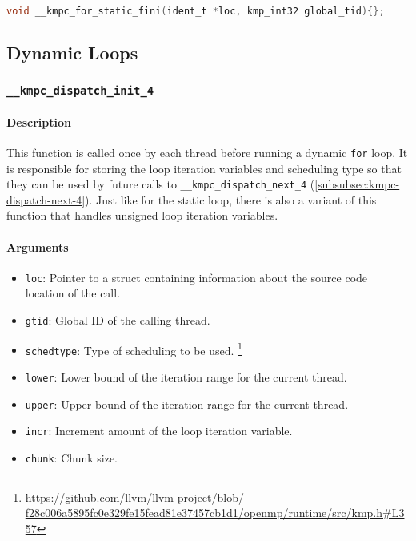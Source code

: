 \begin{lstlisting}[language=C, caption={\_\_kmpc\_for\_static\_fini}, label={lst:for-static-fini},
                   escapechar=@]
void __kmpc_for_static_fini(ident_t *loc, kmp_int32 global_tid){};
\end{lstlisting}

\subsection{Dynamic Loops}

\subsubsection{\texttt{__kmpc_dispatch_init_4}}

\paragraph{Description} This function is called once by each thread before running a dynamic
\texttt{for} loop. It is responsible for storing the loop iteration variables and scheduling type so
that they can be used by future calls to \texttt{__kmpc_dispatch_next_4}
(\cref{subsubsec:kmpc-dispatch-next-4}). Just like for the static loop, there is also a variant of
this function that handles unsigned loop iteration variables.

\paragraph{Arguments}
\begin{itemize}
	\item \texttt{loc}: Pointer to a struct containing information about the source code location
	      of the call.
	\item \texttt{gtid}: Global ID of the calling thread.
	\item \texttt{schedtype}: Type of scheduling to be used.
	      \footnote{\url{
			      https://github.com/llvm/llvm-project/blob/
			      f28c006a5895fc0e329fe15fead81e37457cb1d1/openmp/runtime/src/kmp.h\#L357}}
	\item \texttt{lower}: Lower bound of the iteration range for the current thread.
	\item \texttt{upper}: Upper bound of the iteration range for the current thread.
	\item \texttt{incr}: Increment amount of the loop iteration variable.
	\item \texttt{chunk}: Chunk size.
\end{itemize}


